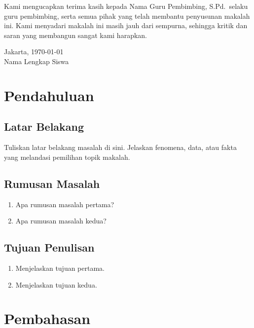 \documentclass[12pt,a4paper]{article}
\newcommand{\namaSiswa}{Nama Lengkap Siswa}
\newcommand{\namaGuru}{Nama Guru Pembimbing, S.Pd.}
\newcommand{\namaKota}{Jakarta}
\begin{document}
Kami mengucapkan terima kasih kepada \namaGuru\ selaku guru pembimbing, serta semua pihak yang telah membantu penyusunan makalah ini. Kami menyadari makalah ini masih jauh dari sempurna, sehingga kritik dan saran yang membangun sangat kami harapkan.

\vspace{1cm}
\begin{flushright}
\namaKota, \today\\[1.5cm]
\namaSiswa
\end{flushright}

\newpage

\renewcommand{\contentsname}{Daftar Isi}
\tableofcontents
\newpage

\section{Pendahuluan}
\subsection{Latar Belakang}
Tuliskan latar belakang masalah di sini. Jelaskan fenomena, data, atau fakta yang melandasi pemilihan topik makalah.

\subsection{Rumusan Masalah}
\begin{enumerate}[label=\arabic*., leftmargin=*]
  \item Apa rumusan masalah pertama?
  \item Apa rumusan masalah kedua?
\end{enumerate}

\subsection{Tujuan Penulisan}
\begin{enumerate}[label=\arabic*., leftmargin=*]
  \item Menjelaskan tujuan pertama.
  \item Menjelaskan tujuan kedua.
\end{enumerate}

\section{Pembahasan}
\end{document}
